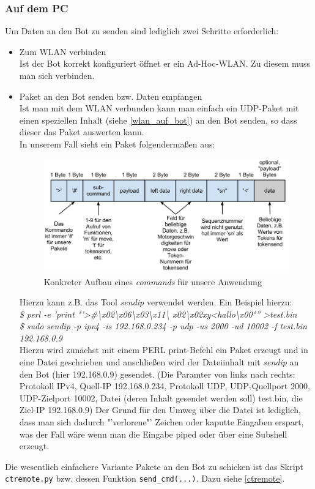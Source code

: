 \subsubsection{Auf dem PC}
Um Daten an den Bot zu senden sind lediglich zwei Schritte erforderlich:
\begin{itemize}
	\item Zum WLAN verbinden\\
	Ist der Bot korrekt konfiguriert öffnet er ein Ad-Hoc-WLAN. Zu diesem muss man sich verbinden.
	\item Paket an den Bot senden bzw. Daten empfangen\\
	Ist man mit dem WLAN verbunden kann man einfach ein UDP-Paket mit einen speziellen Inhalt (siehe \ref{wlan_auf_bot}) an den Bot senden, so dass dieser das Paket auswerten kann.\\
	In unserem Fall sieht ein Paket folgendermaßen aus:
	\begin{figure}[H]
		\centering
		\includegraphics[scale=0.5]{pic/ctBotWlanKonkret}
		\caption{Konkreter Aufbau eines \textit{commands} für unsere Anwendung}
		\label{ctBotWlanKonkret}
	\end{figure}
	
	Hierzu kann z.B. das Tool \textit{sendip} verwendet werden. Ein Beispiel hierzu:\\
	\textit{\$ perl -e 'print "'\textgreater\#\textbackslash x02\textbackslash x06\textbackslash x03\textbackslash x11\textbackslash
    x02\textbackslash x02xy\textless hallo\textbackslash x00"'' \textgreater test.bin\\
    \$ sudo sendip -p ipv4 -is 192.168.0.234 -p udp -us 2000 -ud 10002 -f test.bin 192.168.0.9}\\
    Hierzu wird zunächst mit einem PERL print-Befehl ein Paket erzeugt und in eine Datei geschrieben und anschließen wird der Dateiinhalt mit \textit{sendip} an den Bot (hier 192.168.0.9) gesendet.
	(Die Paramter von links nach rechts: Protokoll IPv4, Quell-IP 192.168.0.234, Protokoll UDP, UDP-Quellport 2000, UDP-Zielport 10002, Datei (deren Inhalt gesendet werden soll) test.bin, die Ziel-IP 192.168.0.9)
	Der Grund für den Umweg über die Datei ist lediglich, dass man sich dadurch "'verlorene"' Zeichen oder kaputte Eingaben erspart, was der Fall wäre wenn man die Eingabe piped oder über eine Subshell erzeugt.
\end{itemize}
Die wesentlich einfachere Variante Pakete an den Bot zu schicken ist das Skript \verb+ctremote.py+ bzw. dessen Funktion \verb+send_cmd(...)+. Dazu siehe \ref{ctremote}.

